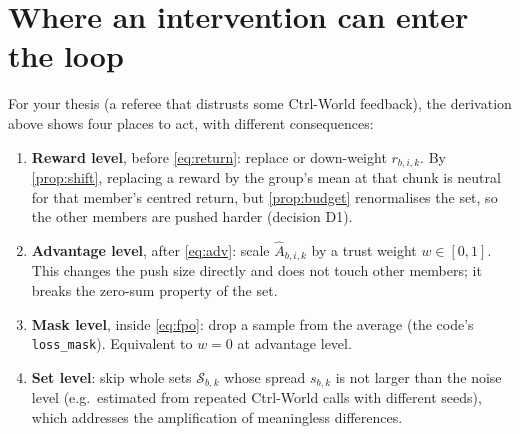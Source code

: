 \documentclass[11pt,a4paper]{article}
\newcommand{\Ah}{\hat A}
\theoremstyle{remark}
\begin{document}
\section{Where an intervention can enter the loop}
For your thesis (a referee that distrusts some Ctrl-World feedback), the derivation above shows four places to act, with different consequences:
\begin{enumerate}
\item \textbf{Reward level}, before \eqref{eq:return}: replace or down-weight $r_{b,i,k}$. By \cref{prop:shift}, replacing a reward by the group's mean at that chunk is neutral for that member's centred return, but \cref{prop:budget} renormalises the set, so the other members are pushed harder (decision D1).
\item \textbf{Advantage level}, after \eqref{eq:adv}: scale $\Ah_{b,i,k}$ by a trust weight $w\in[0,1]$. This changes the push size directly and does not touch other members; it breaks the zero-sum property of the set.
\item \textbf{Mask level}, inside \eqref{eq:fpo}: drop a sample from the average (the code's \texttt{loss\_mask}). Equivalent to $w=0$ at advantage level.
\item \textbf{Set level}: skip whole sets $\mathcal S_{b,k}$ whose spread $s_{b,k}$ is not larger than the noise level (e.g.\ estimated from repeated Ctrl-World calls with different seeds), which addresses the amplification of meaningless differences.
\end{enumerate}

\appendix
\end{document}
